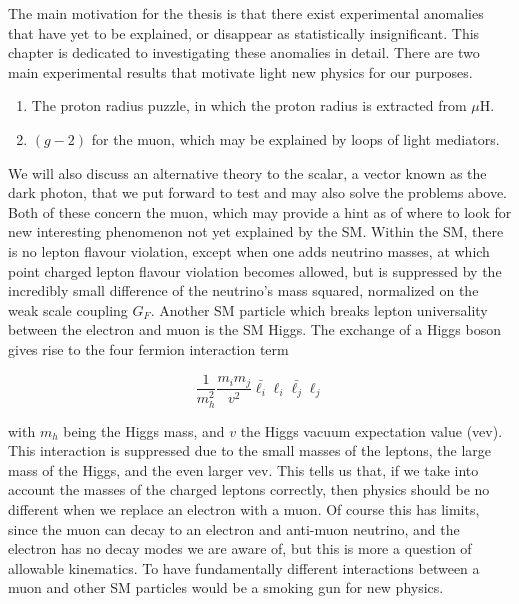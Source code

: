\label{chapter:review}

The main motivation for the thesis is that there exist experimental anomalies that have yet to be explained, or disappear as statistically insignificant.
This chapter is dedicated to investigating these anomalies in detail.
There are two main experimental results that motivate light new physics for our purposes.

\begin{enumerate}
    \item The proton radius puzzle, in which the proton radius is extracted from $\mu\textrm{H}$.
    \item $(g-2)$ for the muon, which may be explained by loops of light mediators.
\end{enumerate}

We will also discuss an alternative theory to the scalar, a vector known as the dark photon, that we put forward to test and may also solve the problems above.
Both of these concern the muon, which may provide a hint as of where to look for new interesting phenomenon not yet explained by the SM.
Within the SM, there is no lepton flavour violation, except when one adds neutrino masses, at which point charged lepton flavour violation becomes allowed, but is suppressed by the incredibly small difference of the neutrino's mass squared, normalized on the weak scale coupling $G_F$.
Another SM particle which breaks lepton universality between the electron and muon is the SM Higgs.
The exchange of a Higgs boson gives rise to the four fermion interaction term

\begin{equation}
\frac{1}{m_h^2} \frac{m_i m_j}{v^2} \bar{\ell_i} \ell_i \bar{\ell_j} \ell_j
\end{equation}

\noindent with $m_h$ being the Higgs mass, and $v$ the Higgs vacuum expectation value (vev).
This interaction is suppressed due to the small masses of the leptons, the large mass of the Higgs, and the even larger vev.
This tells us that, if we take into account the masses of the charged leptons correctly, then physics should be no different when we replace an electron with a muon.
Of course this has limits, since the muon can decay to an electron and anti-muon neutrino, and the electron has no decay modes we are aware of, but this is more a question of allowable kinematics.
To have fundamentally different interactions between a muon and other SM particles would be a smoking gun for new physics.



